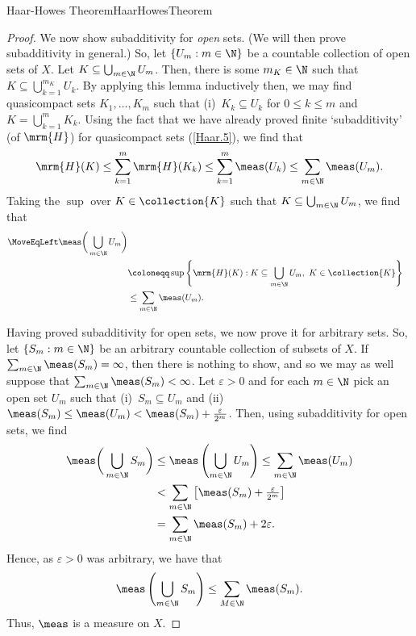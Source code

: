 \begin{thm}{Haar-Howes Theorem}{HaarHowesTheorem}
\begin{proof}
We now show subadditivity for \emph{open} sets.  (We will then prove subadditivity in general.)  So, let $\{ U_m:m\in \N \}$ be a countable collection of open sets of $X$.  Let $K\subseteq \bigcup _{m\in \N}U_m$.  Then, there is some $m_K\in \N$ such that $K\subseteq \bigcup _{k=1}^{m_K}U_k$.  By applying this lemma inductively then, we may find quasicompact sets $K_1,\ldots ,K_m$ such that (i)~$K_k\subseteq U_k$ for $0\leq k\leq m$ and $K=\bigcup _{k=1}^mK_k$.  Using the fact that we have already proved finite `subadditivity' (of $\mrm{H}$) for quasicompact sets (\cref{Haar.5}), we find that
\begin{equation}
\mrm{H}(K)\leq \sum _{k=1}^m\mrm{H}(K_k)\leq \sum _{k=1}^m\meas (U_k)\leq \sum _{m\in \N}\meas (U_m).
\end{equation}
Taking the $\sup$ over $K\in \collection{K}$ such that $K\subseteq \bigcup _{m\in \N}U_m$, we find that
\begin{equation}
\begin{split}
\MoveEqLeft
\meas \bigg( \bigcup _{m\in \N}U_m\bigg) \\
& \coloneqq \sup \left\{ \mrm{H}(K):K\subseteq \bigcup _{m\in \N}U_m,\ K\in \collection{K}\right\} \\
& \leq \sum _{m\in \N}\meas (U_m).
\end{split}
\end{equation}

Having proved subadditivity for open sets, we now prove it for arbitrary sets.  So, let $\{ S_m:m\in \N \}$ be an arbitrary countable collection of subsets of $X$.  If $\sum _{m\in \N}\meas (S_m)=\infty$, then there is nothing to show, and so we may as well suppose that $\sum _{m\in \N}\meas (S_m)<\infty$.  Let $\varepsilon >0$ and for each $m\in \N$ pick an open set $U_m$ such that (i)~$S_m\subseteq U_m$ and (ii)~$\meas (S_m)\leq \meas (U_m)<\meas (S_m)+\frac{\varepsilon}{2^m}$.  Then, using subadditivity for open sets, we find
\begin{equation}
\begin{split}
\meas \bigg( \bigcup _{m\in \N}S_m\bigg) & \leq \meas \left( \bigcup _{m\in \N}U_m\right) \leq \sum _{m\in \N}\meas (U_m) \\
& <\sum _{m\in \N}\left[ \meas (S_m)+\tfrac{\varepsilon}{2^m}\right] \\
& =\sum _{m\in \N}\meas (S_m)+2\varepsilon .
\end{split}
\end{equation}
Hence, as $\varepsilon >0$ was arbitrary, we have that
\begin{equation}
\meas \left( \bigcup _{m\in \N}S_m\right) \leq \sum _{M\in \N}\meas (S_m).
\end{equation}
Thus, $\meas$ is a measure on $X$.


\end{proof}
\end{thm}
